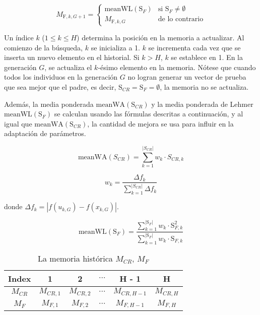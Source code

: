 \begin{equation}
M_{\text{F},k,G+1} =
\begin{cases} 
\text{meanWL}(\text{S}_{F}) & \text{si } \text{S}_{F} \neq \emptyset \\
M_{\text{F},k,G} & \text{de lo contrario}
\end{cases}
\end{equation}

\vspace{10px}

\noindent Un índice \(k\) (\(1 \leq k \leq H\)) determina la posición en la memoria a actualizar. Al comienzo de la búsqueda, \(k\) se inicializa a 1. \(k\) se incrementa cada vez que se inserta un nuevo elemento en el historial. Si \(k > H\), \(k\) se establece en 1. En la generación \(G\), se actualiza el \(k\)-ésimo elemento en la memoria. Nótese que cuando todos los individuos en la generación \(G\) no logran generar un vector de prueba que sea mejor que el padre, es decir, \(\text{S}_{CR} = \text{S}_{F} = \emptyset\), la memoria no se actualiza.

\noindent Además, la media ponderada \(\text{meanWA}(\text{S}_{CR})\) y la media ponderada de Lehmer \(\text{meanWL}(\text{S}_{F})\) se calculan usando las fórmulas descritas a continuación, y al igual que \(\text{meanWA}(\text{S}_{CR})\), la cantidad de mejora se usa para influir en la adaptación de parámetros.

\begin{equation}
\text{meanWA}(S_{CR}) = \sum_{k=1}^{|S_{CR}|} w_k \cdot S_{CR,k}
\end{equation}

\begin{equation}
w_k = \frac{\Delta f_k}{\sum_{k=1}^{|S_{CR}|} \Delta f_k}
\end{equation}

\noindent donde \(\Delta f_k = |f(u_{k,G}) - f(x_{k,G})|\).

\begin{equation}
\text{meanWL}(\text{S}_{F}) = \frac{\sum_{k=1}^{|\text{S}_{F}|} w_k \cdot \text{S}_{F,k}^2}{\sum_{k=1}^{|\text{S}_{F}|} w_k \cdot \text{S}_{F,k}}
\end{equation}

\begin{table}[h!]
\centering
\begin{tabular}{|c|c|c|c|c|c|}
\hline
\textbf{Index} & \textbf{1} & \textbf{2} & $\cdots$ & \textbf{H - 1} & \textbf{H} \\ \hline
$M_{CR}$ & $M_{CR,1}$ & $M_{CR,2}$ & $\cdots$ & $M_{CR,H-1}$ & $M_{CR,H}$ \\ \hline
$M_{F}$ & $M_{F,1}$ & $M_{F,2}$ & $\cdots$ & $M_{F,H-1}$ & $M_{F,H}$ \\ \hline
\end{tabular}
\caption{La memoria histórica $M_{CR}$, $M_{F}$}
\label{fig:historical_memory}
\end{table}

